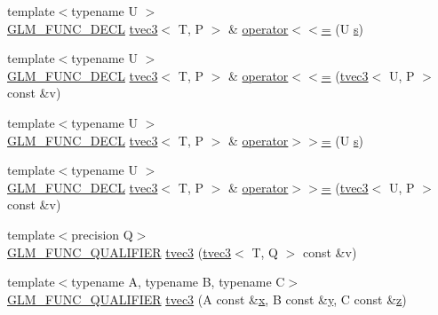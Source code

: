 \begin{DoxyCompactItemize}
\item 
{\footnotesize template$<$typename U $>$ }\\\hyperlink{setup_8hpp_ab2d052de21a70539923e9bcbf6e83a51}{G\+L\+M\+\_\+\+F\+U\+N\+C\+\_\+\+D\+E\+CL} \hyperlink{structglm_1_1detail_1_1tvec3}{tvec3}$<$ T, P $>$ \& \hyperlink{structglm_1_1detail_1_1tvec3_a9a985982567897cff02307730e4ae5a1}{operator$<$$<$=} (U \hyperlink{structglm_1_1detail_1_1tvec3_aa7906d8cd1a54c96ba22c1f97ebaf7cc}{s})
\item 
{\footnotesize template$<$typename U $>$ }\\\hyperlink{setup_8hpp_ab2d052de21a70539923e9bcbf6e83a51}{G\+L\+M\+\_\+\+F\+U\+N\+C\+\_\+\+D\+E\+CL} \hyperlink{structglm_1_1detail_1_1tvec3}{tvec3}$<$ T, P $>$ \& \hyperlink{structglm_1_1detail_1_1tvec3_a93c05e5b5b1a09319f62d30dac259516}{operator$<$$<$=} (\hyperlink{structglm_1_1detail_1_1tvec3}{tvec3}$<$ U, P $>$ const \&v)
\item 
{\footnotesize template$<$typename U $>$ }\\\hyperlink{setup_8hpp_ab2d052de21a70539923e9bcbf6e83a51}{G\+L\+M\+\_\+\+F\+U\+N\+C\+\_\+\+D\+E\+CL} \hyperlink{structglm_1_1detail_1_1tvec3}{tvec3}$<$ T, P $>$ \& \hyperlink{structglm_1_1detail_1_1tvec3_aaf71601d2b5d3be4eb778f1f3871a551}{operator$>$$>$=} (U \hyperlink{structglm_1_1detail_1_1tvec3_aa7906d8cd1a54c96ba22c1f97ebaf7cc}{s})
\item 
{\footnotesize template$<$typename U $>$ }\\\hyperlink{setup_8hpp_ab2d052de21a70539923e9bcbf6e83a51}{G\+L\+M\+\_\+\+F\+U\+N\+C\+\_\+\+D\+E\+CL} \hyperlink{structglm_1_1detail_1_1tvec3}{tvec3}$<$ T, P $>$ \& \hyperlink{structglm_1_1detail_1_1tvec3_a4b3fa6e8ad7b60b8bd7d87e9918bb9fc}{operator$>$$>$=} (\hyperlink{structglm_1_1detail_1_1tvec3}{tvec3}$<$ U, P $>$ const \&v)
\item 
{\footnotesize template$<$precision Q$>$ }\\\hyperlink{setup_8hpp_a33fdea6f91c5f834105f7415e2a64407}{G\+L\+M\+\_\+\+F\+U\+N\+C\+\_\+\+Q\+U\+A\+L\+I\+F\+I\+ER} \hyperlink{structglm_1_1detail_1_1tvec3_a24728ecfb1a04a02cf53f27e4a536395}{tvec3} (\hyperlink{structglm_1_1detail_1_1tvec3}{tvec3}$<$ T, Q $>$ const \&v)
\item 
{\footnotesize template$<$typename A, typename B, typename C$>$ }\\\hyperlink{setup_8hpp_a33fdea6f91c5f834105f7415e2a64407}{G\+L\+M\+\_\+\+F\+U\+N\+C\+\_\+\+Q\+U\+A\+L\+I\+F\+I\+ER} \hyperlink{structglm_1_1detail_1_1tvec3_a3180ac888680910e3b6c42d77ab8c299}{tvec3} (A const \&\hyperlink{structglm_1_1detail_1_1tvec3_a9c7bc0ecd949a50b911cda1800c4a9c6}{x}, B const \&\hyperlink{structglm_1_1detail_1_1tvec3_a3de16793bf75ea1e959c3d044709ded7}{y}, C const \&\hyperlink{structglm_1_1detail_1_1tvec3_a9996ce4dc16af21710bd1f7102fa66a7}{z})

\end{DoxyCompactItemize}
